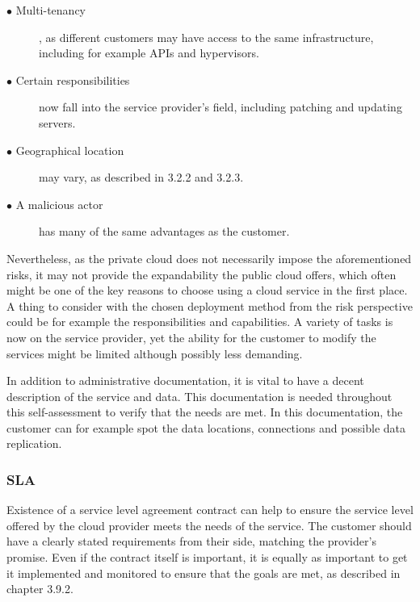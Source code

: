 \documentclass{article}
\begin{document}
\begin{description}
	\item[$\bullet$ Multi-tenancy], as different customers may have access to the same infrastructure, including for example APIs and hypervisors.
	\item[$\bullet$ Certain responsibilities] now fall into the service provider's field, including patching and updating servers.
	\item[$\bullet$ Geographical location] may vary, as described in 3.2.2 and 3.2.3.
	\item[$\bullet$ A malicious actor] has many of the same advantages as the customer.
\end{description}

Nevertheless, as the private cloud does not necessarily impose the aforementioned risks, it may not provide the expandability the public cloud offers, which often might be one of the key reasons to choose using a cloud service in the first place.
A thing to consider with the chosen deployment method from the risk perspective could be for example the responsibilities and capabilities. A variety of tasks is now on the service provider, yet the ability for the customer to modify the services might be limited although possibly less demanding.
\par
In addition to administrative documentation, it is vital to have a decent description of the service and data. This documentation is needed throughout this self-assessment to verify that the needs are met. In this documentation, the customer can for example spot the data locations, connections and possible data replication.

\subsubsection{SLA}
Existence of a service level agreement contract can help to ensure the service level offered by the cloud provider meets the needs of the service. The customer should have a clearly stated requirements from their side, matching the provider's promise. Even if the contract itself is important, it is equally as important to get it implemented and monitored to ensure that the goals are met, as described in chapter 3.9.2.
\end{document}
